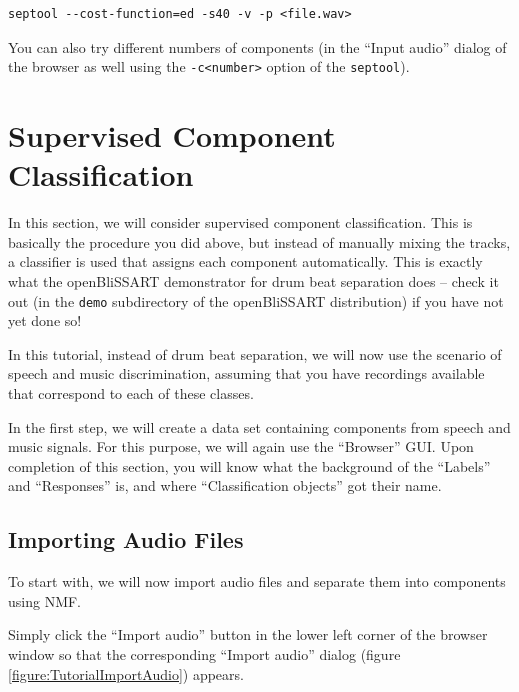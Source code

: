 \begin{verbatim}
septool --cost-function=ed -s40 -v -p <file.wav>
\end{verbatim}

You can also try different numbers of components (in the ``Input audio'' dialog
of the browser as well using the {\tt -c<number>} option of the {\tt septool}).



\section{Supervised Component Classification}
\label{sec:SupervisedCC}

In this section, we will consider supervised component classification. This is
basically the procedure you did above, but instead of manually mixing the
tracks, a classifier is used that assigns each component automatically.  This
is exactly what the openBliSSART demonstrator for drum beat separation does --
check it out (in the {\tt demo} subdirectory of the openBliSSART distribution)
if you have not yet done so!
 
In this tutorial, instead of drum beat separation, we will now use the scenario
of speech and music discrimination, assuming that you have recordings available
that correspond to each of these classes.

In the first step, we will create a data set containing components from speech
and music signals. For this purpose, we will again use the ``Browser'' GUI.
Upon completion of this section, you will know what the background of the
``Labels'' and ``Responses'' is, and where ``Classification objects'' got their
name. 


\subsection{Importing Audio Files}

To start with, we will now import audio files and separate them into components
using NMF.

Simply click the ``Import audio'' button in the lower left corner of the browser
window so that the corresponding ``Import audio'' dialog (figure
\ref{figure:TutorialImportAudio}) appears.

